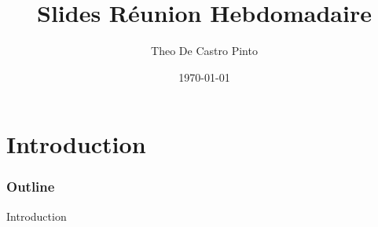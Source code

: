 \documentclass[9pt]{beamer}
\title{Slides Réunion Hebdomadaire}
\author{Theo De Castro Pinto}
\date{\today}
\begin{document}
\section{Introduction}

\begin{frame}
\titlepage
\end{frame}

\begin{frame}
\frametitle{Outline}
\tableofcontents
\end{frame}

\begin{frame}{Introduction} 

\end{frame}
\end{document}
